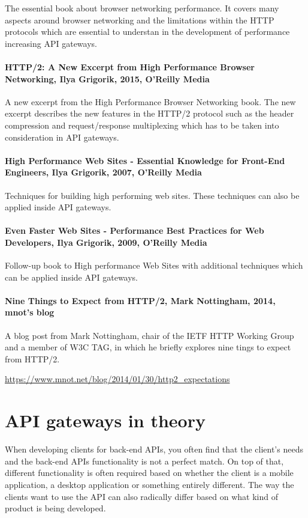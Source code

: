 \documentclass{cslthse-msc}
\begin{document}
The essential book about browser networking performance. It covers many aspects around browser networking and the limitations within the HTTP protocols which are essential to understan in the development of performance increasing API gateways.

\subsubsection{HTTP/2: A New Excerpt from High Performance Browser Networking, Ilya Grigorik, 2015, O'Reilly Media}

A new excerpt from the High Performance Browser Networking book. The new excerpt describes the new features in the HTTP/2 protocol such as the header compression and request/response multiplexing which has to be taken into consideration in API gateways.

\subsubsection{High Performance Web Sites - Essential Knowledge for Front-End Engineers, Ilya Grigorik, 2007, O'Reilly Media}

Techniques for building high performing web sites. These techniques can also be applied inside API gateways.

\subsubsection{Even Faster Web Sites - Performance Best Practices for Web Developers, Ilya Grigorik, 2009, O'Reilly Media}

Follow-up book to High performance Web Sites with additional techniques which can be applied inside API gateways.

\subsubsection{Nine Things to Expect from HTTP/2, Mark Nottingham, 2014, mnot's blog}

A blog post from Mark Nottingham, chair of the IETF HTTP Working Group and a member of W3C TAG, in which he briefly explores nine tings to expect from HTTP/2.

\noindent \url{https://www.mnot.net/blog/2014/01/30/http2_expectations}

\chapter{API gateways in theory}
When developing clients for back-end APIs, you often find that the client's needs and the back-end APIs functionality is not a perfect match. On top of that, different functionality is often required based on whether the client is a mobile application, a desktop application or something entirely different. The way the clients want to use the API can also radically differ based on what kind of product is being developed.
\end{document}
